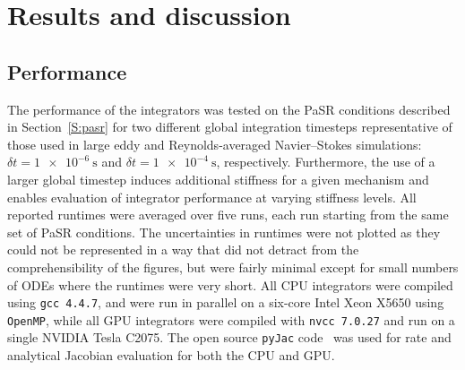 \documentclass[preprint]{elsarticle}
\begin{document}
\section{Results and discussion}

\subsection{Performance}

The performance of the integrators was tested on the PaSR conditions described in Section~\ref{S:pasr} for two different global integration timesteps representative of those used in large eddy and Reynolds-averaged Navier--Stokes simulations: $\delta t = \SI{1e-6}{\s}$ and $\delta t = \SI{1e-4}{\s}$, respectively.
Furthermore, the use of a larger global timestep induces additional stiffness for a given mechanism and enables evaluation of integrator performance at varying stiffness levels.
All reported runtimes were averaged over five runs, each run starting from the same set of PaSR conditions.
The uncertainties in runtimes were not plotted as they could not be represented in a way that did not detract from the comprehensibility of the figures, but were fairly minimal except for small numbers of ODEs where the runtimes were very short.
All CPU integrators were compiled using \texttt{gcc 4.4.7}, and were run in parallel on a six-core Intel Xeon X5650 using \texttt{OpenMP}, while all GPU integrators were compiled with \texttt{nvcc 7.0.27} and run on a single NVIDIA Tesla C2075.
The open source \texttt{pyJac} code~\cite{Niemeyer:2015im,Niemeyer:2015ws} was used for rate and analytical Jacobian evaluation for both the CPU and GPU.
\end{document}
